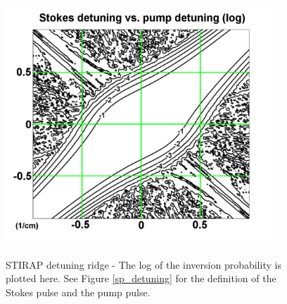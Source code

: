 \begin{figure}
\begin{center}
\leavevmode
\includegraphics[width=4in]
{ridge/ridge.png}\\
\end{center}
\caption[STIRAP detuning ridge]{STIRAP detuning ridge - The log of the inversion probability is plotted here. See Figure \ref{sp_detuning} for the definition of the Stokes pulse and the pump pulse.}
\label{ridge}
\end{figure} 
